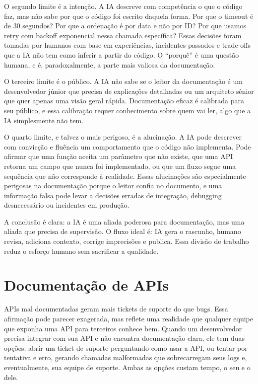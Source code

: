 O segundo limite é a intenção. A IA descreve com competência o que o
código faz, mas não sabe por que o código foi escrito daquela forma.
Por que o timeout é de 30 segundos? Por que a ordenação é por data e
não por ID? Por que usamos retry com backoff exponencial nessa chamada
específica? Essas decisões foram tomadas por humanos com base em
experiências, incidentes passados e trade-offs que a IA não tem como
inferir a partir do código. O ``porquê'' é uma questão humana, e
é, paradoxalmente, a parte mais valiosa da documentação.

O terceiro limite é o público. A IA não sabe se o leitor da
documentação é um desenvolvedor júnior que precisa de explicações
detalhadas ou um arquiteto sênior que quer apenas uma visão geral
rápida. Documentação eficaz é calibrada para seu público, e essa
calibração requer conhecimento sobre quem vai ler, algo que a IA
simplesmente não tem.

O quarto limite, e talvez o mais perigoso, é a alucinação. A IA pode
descrever com convicção e fluência um comportamento que o código não
implementa. Pode afirmar que uma função aceita um parâmetro que não
existe, que uma API retorna um campo que nunca foi implementado, ou
que um fluxo segue uma sequência que não corresponde à realidade.
Essas alucinações são especialmente perigosas na documentação porque
o leitor confia no documento, e uma informação falsa pode levar a
decisões erradas de integração, debugging desnecessário ou incidentes
em produção.

A conclusão é clara: a IA é uma aliada poderosa para documentação, mas
uma aliada que precisa de supervisão. O fluxo ideal é: IA gera o
rascunho, humano revisa, adiciona contexto, corrige imprecisões e
publica. Essa divisão de trabalho reduz o esforço humano sem
sacrificar a qualidade.


\section{Documentação de APIs}

APIs mal documentadas geram mais tickets de suporte do que bugs. Essa
afirmação pode parecer exagerada, mas reflete uma realidade que qualquer
equipe que exponha uma API para terceiros conhece bem. Quando um
desenvolvedor precisa integrar com sua API e não encontra documentação
clara, ele tem duas opções: abrir um ticket de suporte perguntando como
usar a API, ou tentar por tentativa e erro, gerando chamadas malformadas
que sobrecarregam seus logs e, eventualmente, sua equipe de suporte.
Ambas as opções custam tempo, o seu e o dele.

